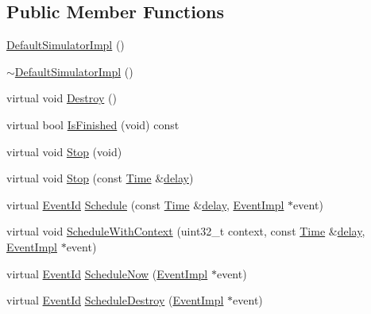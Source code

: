 \subsection*{Public Member Functions}
\begin{DoxyCompactItemize}
\item 
\hyperlink{classns3_1_1DefaultSimulatorImpl_adc64065914aed53dcf4aaf861246ceb9}{Default\+Simulator\+Impl} ()
\item 
\hyperlink{classns3_1_1DefaultSimulatorImpl_aa8ba918a21d60d714e05a1c7005957eb}{$\sim$\+Default\+Simulator\+Impl} ()
\item 
virtual void \hyperlink{classns3_1_1DefaultSimulatorImpl_aae01d7f88f7d68f37618f0fc4ad6fd40}{Destroy} ()
\item 
virtual bool \hyperlink{classns3_1_1DefaultSimulatorImpl_ac3fa48ebcf8a6cc8feb55e1fd016c790}{Is\+Finished} (void) const 
\item 
virtual void \hyperlink{classns3_1_1DefaultSimulatorImpl_a2851593d65fdbee8f78fc351dc7d74a0}{Stop} (void)
\item 
virtual void \hyperlink{classns3_1_1DefaultSimulatorImpl_a2fbb62a5fc30f2bc09fe68a6346eab79}{Stop} (const \hyperlink{classns3_1_1Time}{Time} \&\hyperlink{mmwave_2model_2fading-traces_2fading__trace__generator_8m_a7964e6aa8f61a9d28973c8267a606ad8}{delay})
\item 
virtual \hyperlink{classns3_1_1EventId}{Event\+Id} \hyperlink{classns3_1_1DefaultSimulatorImpl_acb4b859e485d6319db25356ff8572cad}{Schedule} (const \hyperlink{classns3_1_1Time}{Time} \&\hyperlink{mmwave_2model_2fading-traces_2fading__trace__generator_8m_a7964e6aa8f61a9d28973c8267a606ad8}{delay}, \hyperlink{classns3_1_1EventImpl}{Event\+Impl} $\ast$event)
\item 
virtual void \hyperlink{classns3_1_1DefaultSimulatorImpl_a94fec0f49d640c8e8067748bd91d97c2}{Schedule\+With\+Context} (uint32\+\_\+t context, const \hyperlink{classns3_1_1Time}{Time} \&\hyperlink{mmwave_2model_2fading-traces_2fading__trace__generator_8m_a7964e6aa8f61a9d28973c8267a606ad8}{delay}, \hyperlink{classns3_1_1EventImpl}{Event\+Impl} $\ast$event)
\item 
virtual \hyperlink{classns3_1_1EventId}{Event\+Id} \hyperlink{classns3_1_1DefaultSimulatorImpl_a3379b3942e284feb17ecb6f2a90a2fb5}{Schedule\+Now} (\hyperlink{classns3_1_1EventImpl}{Event\+Impl} $\ast$event)
\item 
virtual \hyperlink{classns3_1_1EventId}{Event\+Id} \hyperlink{classns3_1_1DefaultSimulatorImpl_a0c397b3fa25ad4ec9ffc3fc7a631f889}{Schedule\+Destroy} (\hyperlink{classns3_1_1EventImpl}{Event\+Impl} $\ast$event)

\end{DoxyCompactItemize}
